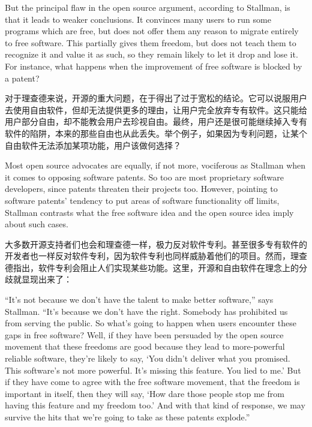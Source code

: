 \ifdefined\eng
But the principal flaw in the open source argument, according to Stallman, is that it leads to weaker conclusions.  It convinces many users to run some programs which are free, but does not offer them any reason to migrate entirely to free software.  This partially gives them freedom, but does not teach them to recognize it and value it as such, so they remain likely to let it drop and lose it.  For instance, what happens when the improvement of free software is blocked by a patent?
\fi

\ifdefined\chs
对于理查德来说，开源的重大问题，在于得出了过于宽松的结论。它可以说服用户去使用自由软件，但却无法提供更多的理由，让用户完全放弃专有软件。这只能给用户部分自由，却不能教会用户去珍视自由。最终，用户还是很可能继续掉入专有软件的陷阱，本来的那些自由也从此丢失。举个例子，如果因为专利问题，让某个自由软件无法添加某项功能，用户该做何选择？
\fi

\ifdefined\eng
Most open source advocates are equally, if not more, vociferous as Stallman when it comes to opposing software patents.  So too are most proprietary software developers, since patents threaten their projects too.  However, pointing to software patents' tendency to put areas of software functionality off limits, Stallman contrasts what the free software idea and the open source idea imply about such cases.
\fi

\ifdefined\chs
大多数开源支持者们也会和理查德一样，极力反对软件专利。甚至很多专有软件的开发者也一样反对软件专利，因为软件专利也同样威胁着他们的项目。然而，理查德指出，软件专利会阻止人们实现某些功能。这里，开源和自由软件在理念上的分歧就显现出来了：
\fi

\ifdefined\eng
``It's not because we don't have the talent to make better software,'' says Stallman. ``It's because we don't have the right. Somebody has prohibited us from serving the public. So what's going to happen when users encounter these gaps in free software? Well, if they have been persuaded by the open source movement that these freedoms are good because they lead to more-powerful reliable software, they're likely to say, `You didn't deliver what you promised. This software's not more powerful. It's missing this feature. You lied to me.' But if they have come to agree with the free software movement, that the freedom is important in itself, then they will say, `How dare those people stop me from having this feature and my freedom too.' And with that kind of response, we may survive the hits that we're going to take as these patents explode.''
\fi

